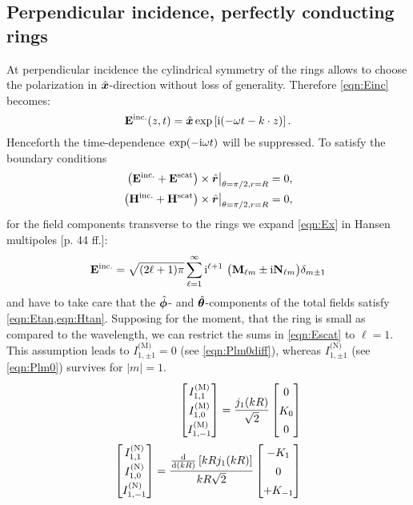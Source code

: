 \subsection{Perpendicular incidence, perfectly conducting rings}
At perpendicular incidence the cylindrical symmetry of the rings allows to choose the polarization in $\hat{\bm{x}}$-direction without loss of generality. Therefore \cref{eqn:Einc} becomes:
\begin{equation}
\mathbf{E}^\text{inc.} (z, t)= \hat{\bm{x}} \exp\left[\mathrm{i} (-\omega t- k\cdot z)\right].
\label{eqn:Ex}
\end{equation}
Henceforth the time-dependence $\exp(-\mathrm{i} \omega t)$ will be suppressed. To satisfy the boundary conditions
\begin{align}
\left.\left(\mathbf{E}^\text{inc.}+\mathbf{E}^\text{scat}\right)\times \hat{\bm{r}}\right\vert_{\theta=\pi/2, r=R} = 0,
\label{eqn:Etan}\\
\left.\left(\mathbf{H}^\text{inc.}+\mathbf{H}^\text{scat}\right)\times \hat{\bm{r}}\right\vert_{\theta=\pi/2, r=R} = 0,
\label{eqn:Htan}
\end{align}
for the field components transverse to the rings we expand \cref{eqn:Ex} in Hansen multipoles \cite{Kristensson2014}[p. 44 ff.]:
\begin{equation}
\mathbf{E}^\text{inc.} = \sqrt{(2\ell+1)\pi}\sum_{\ell=1}^\infty \imag^{\ell+1}\ 
\big( \mathbf{M}_{\ell m} \pm \imag \mathbf{N}_{\ell m}\big) \delta_{m \pm 1}
\label{eqn:Einc}
\end{equation}
and have to take care that the $\hat{\bm{\phi}}$- and $\hat{\bm{\theta}}$-components of the total fields satisfy \cref{eqn:Etan,eqn:Htan}. Supposing for the moment, that the ring is small as compared to the wavelength, we can restrict the sums in \cref{eqn:Escat} to $\ell=1$. This assumption leads to  $I^\text{(M)}_{1,\pm 1}=0$ (see \cref{eqn:Plm0diff}), whereas $I^\text{(N)}_{1,\pm 1}$ (see \cref{eqn:Plm0}) survives for $|m|=1$.
\begin{align}
\left[
\renewcommand\arraystretch{1.4}\begin{matrix}
I_{1,1}^\text{(M)} \\
I_{1,0}^\text{(M)} \\ 
I_{1,-1}^\text{(M)}
\end{matrix} \right]=
\frac{j_1(kR)}{\sqrt{2}} \left[ 
\renewcommand\arraystretch{1.4}\begin{matrix}
0 \\ K_0 \\ 0
\end{matrix}
\right]
\\
\left[
\renewcommand\arraystretch{1.4}\begin{matrix}
I_{1,1}^\text{(N)} \\
I_{1,0}^\text{(N)} \\ 
I_{1,-1}^\text{(N)}
\end{matrix} \right] =  \frac{\frac{\rd}{\rd (kR)}\left[kR j_1(kR)\right]}{kR\sqrt{2}} 
\left[
\renewcommand\arraystretch{1.4}\begin{matrix}
-K_1\\0\\+K_{-1}
\end{matrix}
\right]
\end{align}

